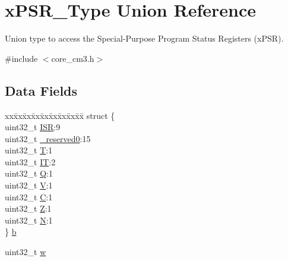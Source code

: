 \hypertarget{unionxPSR__Type}{\section{x\-P\-S\-R\-\_\-\-Type Union Reference}
\label{unionxPSR__Type}
}


Union type to access the Special-\/\-Purpose Program Status Registers (x\-P\-S\-R).  




{\ttfamily \#include $<$core\-\_\-cm3.\-h$>$}

\subsection*{Data Fields}
\begin{DoxyCompactItemize}
\item 
\begin{tabbing}
xx\=xx\=xx\=xx\=xx\=xx\=xx\=xx\=xx\=\kill
struct \{\\
\>uint32\_t \hyperlink{unionxPSR__Type_a3e9120dcf1a829fc8d2302b4d0673970}{ISR}:9\\
\>uint32\_t \hyperlink{unionxPSR__Type_af438e0f407357e914a70b5bd4d6a97c5}{\_reserved0}:15\\
\>uint32\_t \hyperlink{unionxPSR__Type_a7eed9fe24ae8d354cd76ae1c1110a658}{T}:1\\
\>uint32\_t \hyperlink{unionxPSR__Type_a3200966922a194d84425e2807a7f1328}{IT}:2\\
\>uint32\_t \hyperlink{unionxPSR__Type_add7cbd2b0abd8954d62cd7831796ac7c}{Q}:1\\
\>uint32\_t \hyperlink{unionxPSR__Type_af14df16ea0690070c45b95f2116b7a0a}{V}:1\\
\>uint32\_t \hyperlink{unionxPSR__Type_a40213a6b5620410cac83b0d89564609d}{C}:1\\
\>uint32\_t \hyperlink{unionxPSR__Type_a1e5d9801013d5146f2e02d9b7b3da562}{Z}:1\\
\>uint32\_t \hyperlink{unionxPSR__Type_a2db9a52f6d42809627d1a7a607c5dbc5}{N}:1\\
\} \hyperlink{unionxPSR__Type_a45ed8981cba3995bc0bd339cb99ba018}{b}\\

\end{tabbing}\item 
uint32\-\_\-t \hyperlink{unionxPSR__Type_a1a47176768f45f79076c4f5b1b534bc2}{w}
\end{DoxyCompactItemize}


